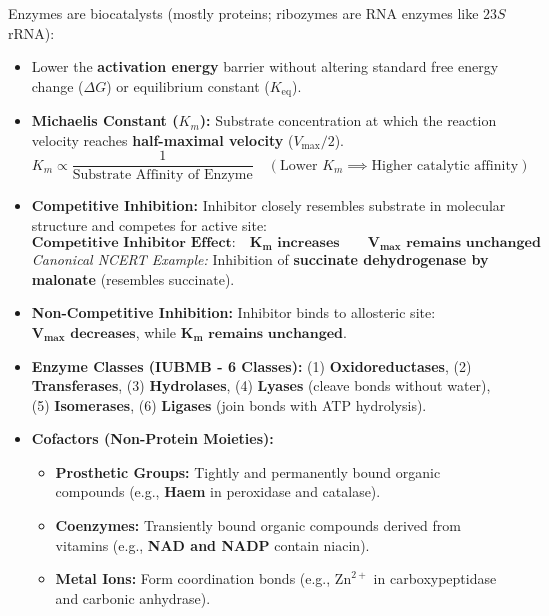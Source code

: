 \documentclass[10pt,a4paper]{article}
\begin{document}
\begin{conceptbox}
Enzymes are biocatalysts (mostly proteins; ribozymes are RNA enzymes like $23S$ rRNA):
\begin{itemize}
  \item Lower the \textbf{activation energy} barrier without altering standard free energy change ($\Delta G$) or equilibrium constant ($K_{\mathrm{eq}}$).
  \item \textbf{Michaelis Constant ($K_m$):} Substrate concentration at which the reaction velocity reaches \textbf{half-maximal velocity} ($V_{\max}/2$).
  \begin{equation}
    K_m \propto \frac{1}{\text{Substrate Affinity of Enzyme}} \quad (\text{Lower } K_m \implies \text{Higher catalytic affinity})
  \end{equation}
  \item \textbf{Competitive Inhibition:} Inhibitor closely resembles substrate in molecular structure and competes for active site:
  \begin{equation}
    \textbf{Competitive Inhibitor Effect:} \quad \mathbf{K_m \text{ increases}} \qquad \mathbf{V_{\max} \text{ remains unchanged}}
  \end{equation}
  \textit{Canonical NCERT Example:} Inhibition of \textbf{succinate dehydrogenase by malonate} (resembles succinate).
  \item \textbf{Non-Competitive Inhibition:} Inhibitor binds to allosteric site: $\mathbf{V_{\max} \text{ decreases}}$, while $\mathbf{K_m \text{ remains unchanged}}$.
  \item \textbf{Enzyme Classes (IUBMB - 6 Classes):} (1) \textbf{Oxidoreductases}, (2) \textbf{Transferases}, (3) \textbf{Hydrolases}, (4) \textbf{Lyases} (cleave bonds without water), (5) \textbf{Isomerases}, (6) \textbf{Ligases} (join bonds with ATP hydrolysis).
  \item \textbf{Cofactors (Non-Protein Moieties):}
  \begin{itemize}
    \item \textbf{Prosthetic Groups:} Tightly and permanently bound organic compounds (e.g., \textbf{Haem} in peroxidase and catalase).
    \item \textbf{Coenzymes:} Transiently bound organic compounds derived from vitamins (e.g., \textbf{NAD and NADP} contain niacin).
    \item \textbf{Metal Ions:} Form coordination bonds (e.g., \textbf{$\mathrm{Zn}^{2+}$} in carboxypeptidase and carbonic anhydrase).
  \end{itemize}
\end{itemize}
\end{conceptbox}
\end{document}
